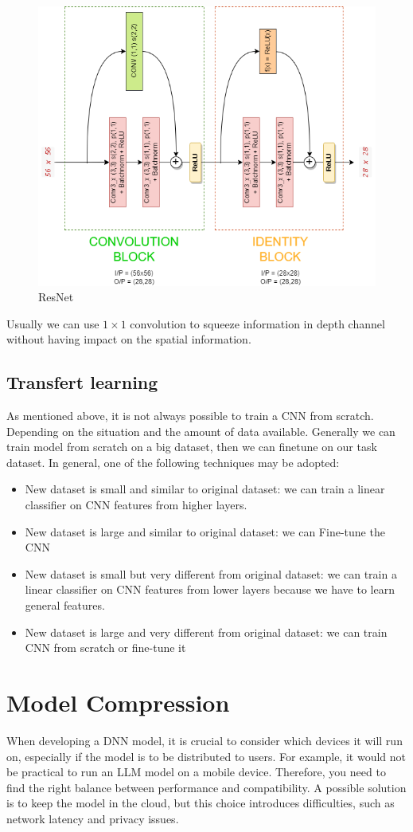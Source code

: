 \begin{itemize}
\begin{figure}[!ht]
            \includegraphics[width=0.5\linewidth]{img/CNN/ResNet.png}
            \caption{ResNet}
            \label{fig:enter-label}
        \end{figure}
\end{itemize}
\begin{note}
    Usually we can use $1 \times 1$ convolution to squeeze information in depth channel without 
    having impact on the spatial information.
\end{note}

\subsection{Transfert learning}
As mentioned above, it is not always possible to train a CNN from scratch. Depending on 
the situation and the amount of data available. Generally we can train model from
scratch on a big dataset, then we can finetune on our task dataset.
In general, one of the following techniques may be adopted:
\begin{itemize}
    \item New dataset is small and similar to original dataset: we can train a linear classifier 
        on CNN features from higher layers.
    \item New dataset is large and similar to original dataset: we can Fine-tune the CNN
    \item New dataset is small but very different from original dataset: we can train a linear 
        classifier on CNN features from lower layers because we have to learn general 
        features.
    \item New dataset is large and very different from original dataset: we can train CNN from 
        scratch or fine-tune it
\end{itemize}



\section{Model Compression}
When developing a DNN model, it is crucial to consider which devices it will run on, especially 
if the model is to be distributed to users. For example, it would not be practical to run an 
LLM model on a mobile device. Therefore, you need to find the right balance between performance
and compatibility. A possible solution is to keep the model in the cloud, but this choice introduces 
difficulties, such as network latency and privacy issues.

